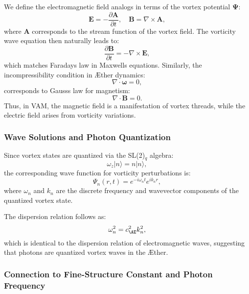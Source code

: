 We define the electromagnetic field analogs in terms of the vortex potential $\boldsymbol{\Psi}$:
\begin{equation*}
    \mathbf{E} = -\frac{\partial \mathbf{A}}{\partial t}, \quad \mathbf{B} = \nabla \times \mathbf{A},
\end{equation*}
where $\mathbf{A}$ corresponds to the stream function of the vortex field. The vorticity wave equation then naturally leads to:
\begin{equation*}
    \frac{\partial \mathbf{B}}{\partial t} = -\nabla \times \mathbf{E},
\end{equation*}
which matches Faraday\rqs s law in Maxwell\rqs s equations. Similarly, the incompressibility condition in Æther dynamics:
\begin{equation*}
    \nabla \cdot \boldsymbol{\omega} = 0,
\end{equation*}
corresponds to Gauss\rqs s law for magnetism:
\begin{equation*}
    \nabla \cdot \mathbf{B} = 0.
\end{equation*}
Thus, in VAM, the magnetic field is a manifestation of vortex threads, while the electric field arises from vorticity variations.

\subsubsection*{Wave Solutions and Photon Quantization}

Since vortex states are quantized via the SL(2)$_q$ algebra:
\begin{equation*}
    \omega_z |n\rangle = n |n\rangle,
\end{equation*}
the corresponding wave function for vorticity perturbations is:
\begin{equation*}
    \Psi_n (r, t) = e^{-i \omega_n t} e^{i k_n r},
\end{equation*}
where $\omega_n$ and $k_n$ are the discrete frequency and wavevector components of the quantized vortex state.

The dispersion relation follows as:
\begin{equation*}
    \omega_n^2 = c_{\AE}^2 k_n^2,
\end{equation*}
which is identical to the dispersion relation of electromagnetic waves, suggesting that photons are quantized vortex waves in the Æther.

\subsubsection*{Connection to Fine-Structure Constant and Photon Frequency}

